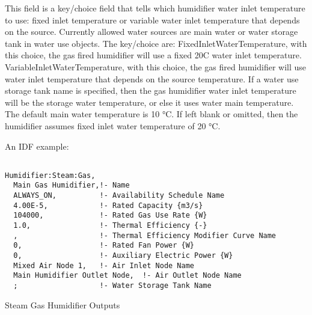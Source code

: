 This field is a key/choice field that tells which humidifier water inlet temperature to use: fixed inlet temperature or variable water inlet temperature that depends on the source. Currently allowed water sources are main water or water storage tank in water use objects. The key/choice are: FixedInletWaterTemperature, with this choice, the gas fired humidifier will use a fixed 20C water inlet temperature. VariableInletWaterTemperature, with this choice, the gas fired humidifier will use water inlet temperature that depends on the source temperature. If a water use storage tank name is specified, then the gas humidifier water inlet temperature will be the storage water temperature, or else it uses water main temperature. The default main water temperature is 10 °C. If left blank or omitted, then the humidifier assumes fixed inlet water temperature of 20 °C.

An IDF example:

\begin{lstlisting}

Humidifier:Steam:Gas,
  Main Gas Humidifier,!- Name
  ALWAYS_ON,          !- Availability Schedule Name
  4.00E-5,            !- Rated Capacity {m3/s}
  104000,             !- Rated Gas Use Rate {W}
  1.0,                !- Thermal Efficiency {-} 
  ,                   !- Thermal Efficiency Modifier Curve Name
  0,                  !- Rated Fan Power {W}
  0,                  !- Auxiliary Electric Power {W}
  Mixed Air Node 1,   !- Air Inlet Node Name
  Main Humidifier Outlet Node,  !- Air Outlet Node Name
  ;                   !- Water Storage Tank Name
\end{lstlisting}

Steam Gas Humidifier Outputs

